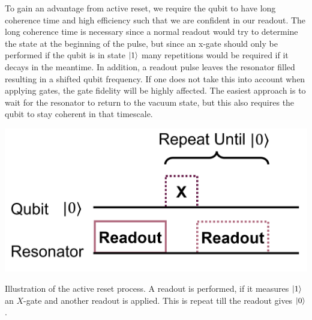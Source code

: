 To gain an advantage from active reset, we require the qubit to have long coherence time and high efficiency such that we are confident in our readout. The long coherence time is necessary since a normal readout would try to determine the state at the beginning of the pulse, but since an x-gate should only be performed if the qubit is in state $\ket{1}$ many repetitions would be required if it decays in the meantime. In addition, a readout pulse leaves the resonator filled resulting in a shifted qubit frequency. If one does not take this into account when applying gates, the gate fidelity will be highly affected. The easiest approach is to wait for the resonator to return to the vacuum state, but this also requires the qubit to stay coherent in that timescale.  
\begin{marginfigure}[- 5 cm]
    \centering
    \includegraphics[]{Figs/circuits/active_reset.png}
    \caption{Illustration of the active reset process. A readout is performed, if it measures $\ket{1}$ an $X$-gate and another readout is applied. This is repeat till the readout gives $\ket{0}$.}
    \label{fig:active_reset}
\end{marginfigure}

